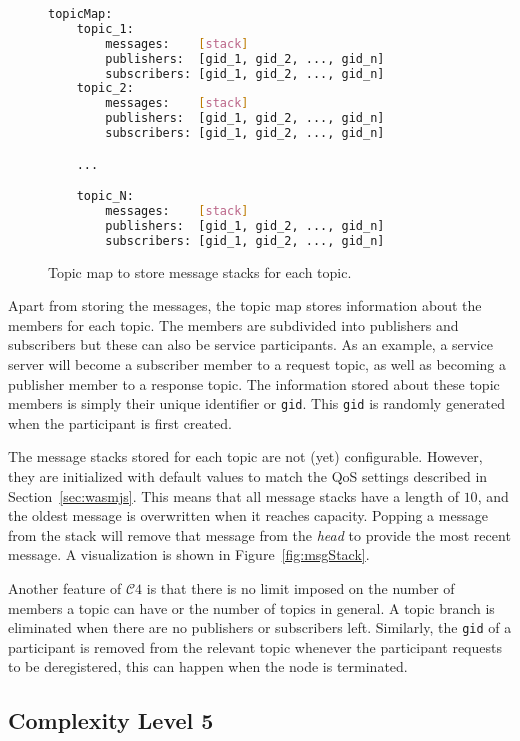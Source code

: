         \begin{figure}[htbp]
            \centering
            \begin{lstlisting}[language=Bash]
topicMap:
    topic_1:
        messages:    [stack]
        publishers:  [gid_1, gid_2, ..., gid_n]
        subscribers: [gid_1, gid_2, ..., gid_n]
    topic_2:
        messages:    [stack]
        publishers:  [gid_1, gid_2, ..., gid_n]
        subscribers: [gid_1, gid_2, ..., gid_n]

    ...

    topic_N:
        messages:    [stack]
        publishers:  [gid_1, gid_2, ..., gid_n]
        subscribers: [gid_1, gid_2, ..., gid_n]
\end{lstlisting}
            \caption{Topic map to store message stacks for each topic.}
            \label{fig:topicMap}
        \end{figure}

        Apart from storing the messages, the topic map stores information about the members for each topic. The members are subdivided into publishers and subscribers but these can also be service participants. As an example, a service server will become a subscriber member to a request topic, as well as becoming a publisher member to a response topic. The information stored about these topic members is simply their unique identifier or \texttt{gid}. This \texttt{gid} is randomly generated when the participant is first created. 

        The message stacks stored for each topic are not (yet) configurable. However, they are initialized with default values to match the \ac{QoS} settings described in Section~\ref{sec:wasmjs}. This means that all message stacks have a length of $10$, and the oldest message is overwritten when it reaches capacity. Popping a message from the stack will remove that message from the \textit{head} to provide the most recent message. A visualization is shown in Figure~\ref{fig:msgStack}.

        Another feature of $\mathcal{C}4$ is that there is no limit imposed on the number of members a topic can have or the number of topics in general. A topic branch is eliminated when there are no publishers or subscribers left. Similarly, the \texttt{gid} of a participant is removed from the relevant topic whenever the participant requests to be deregistered, this can happen when the node is terminated. 


        \subsection{Complexity Level 5}

